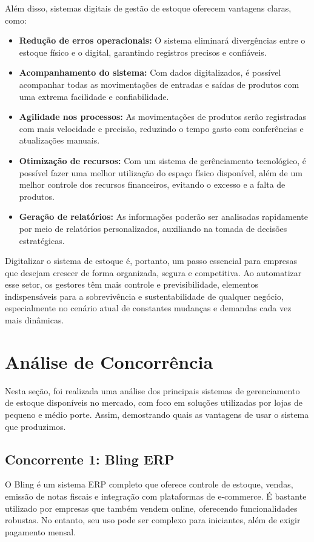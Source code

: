 \documentclass[
	12pt,				%
	openany,			%
	twoside,			%
	a4paper,			%
	english,			%
	brazil				%
	]{abntex2}
\begin{document}
Além disso, sistemas digitais de gestão de estoque oferecem vantagens claras, como:

\begin{itemize}
    \item \textbf{Redução de erros operacionais:} O sistema eliminará divergências entre o estoque físico e o digital, garantindo registros precisos e confiáveis.
    \item \textbf{Acompanhamento do sistema:} Com dados digitalizados, é possível acompanhar todas as movimentações de entradas e saídas de produtos com uma extrema facilidade e confiabilidade.
    \item \textbf{Agilidade nos processos:} As movimentações de produtos serão registradas com mais velocidade e precisão, reduzindo o tempo gasto com conferências e atualizações manuais.
    \item \textbf{Otimização de recursos:} Com um sistema de gerênciamento tecnológico, é possível fazer uma melhor utilização do espaço físico disponível, além de um melhor controle dos recursos financeiros, evitando o excesso e a falta de produtos.
    \item \textbf{Geração de relatórios:} As informações poderão ser analisadas rapidamente por meio de relatórios personalizados, auxiliando na tomada de decisões estratégicas.
\end{itemize}

Digitalizar o sistema de estoque é, portanto, um passo essencial para empresas que desejam crescer de forma organizada, segura e competitiva. Ao automatizar esse setor, os gestores têm mais controle e previsibilidade, elementos indispensáveis para a sobrevivência e sustentabilidade de qualquer negócio, especialmente no cenário atual de constantes mudanças e demandas cada vez mais dinâmicas.

\section{Análise de Concorrência}

Nesta seção, foi realizada uma análise dos principais sistemas de gerenciamento de estoque disponíveis no mercado, com foco em soluções utilizadas por lojas de pequeno e médio porte. Assim, demostrando quais as vantagens de usar o sistema que produzimos.

\subsection{Concorrente 1: Bling ERP}
O Bling é um sistema ERP completo que oferece controle de estoque, vendas, emissão de notas fiscais e integração com plataformas de e-commerce. É bastante utilizado por empresas que também vendem online, oferecendo funcionalidades robustas. No entanto, seu uso pode ser complexo para iniciantes, além de exigir pagamento mensal.
\end{document}
